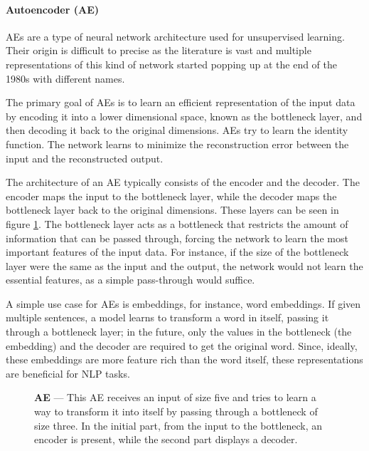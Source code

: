 \paragraph{Autoencoder (AE)} \label{sec:autoencoders}

\Acp{AE} are a type of neural network architecture used for unsupervised learning. Their origin is difficult to precise as the literature is vast and multiple representations of this kind of network started popping up at the end of the 1980s with different names.

The primary goal of \acp{AE} is to learn an efficient representation of the input data by encoding it into a lower dimensional space, known as the bottleneck layer, and then decoding it back to the original dimensions. \Acp{AE} try to learn the identity function. The network learns to minimize the reconstruction error between the input and the reconstructed output.

The architecture of an \ac{AE} typically consists of the encoder and the decoder. The encoder maps the input to the bottleneck layer, while the decoder maps the bottleneck layer back to the original dimensions. These layers can be seen in figure \ref{fig:autoencoder}. The bottleneck layer acts as a bottleneck that restricts the amount of information that can be passed through, forcing the network to learn the most important features of the input data. For instance, if the size of the bottleneck layer were the same as the input and the output, the network would not learn the essential features, as a simple pass-through would suffice.

A simple use case for \acp{AE} is embeddings, for instance, word embeddings. If given multiple sentences, a model learns to transform a word in itself, passing it through a bottleneck layer; in the future, only the values in the bottleneck (the embedding) and the decoder are required to get the original word. Since, ideally, these embeddings are more feature rich than the word itself, these representations are beneficial for \ac{NLP} tasks.

\begin{figure}[ht]
    \centering
    \caption[Autoencoder]{\textbf{\Acf{AE}} --- This \ac{AE} receives an input of size five and tries to learn a way to transform it into itself by passing through a bottleneck of size three. In the initial part, from the input to the bottleneck, an encoder is present, while the second part displays a decoder.}
    \label{fig:autoencoder}
\end{figure}